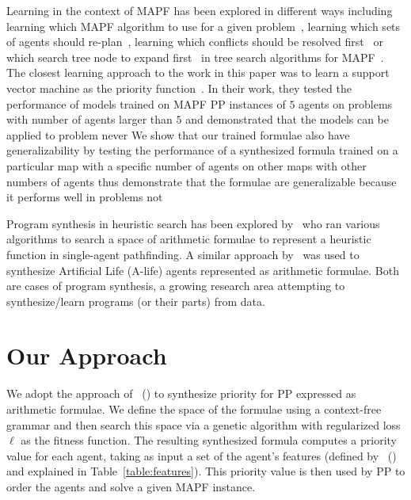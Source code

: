 \documentclass[letterpaper]{article} %
\newcommand{\citea}[1]{\citeauthor{#1}~(\citeyear{#1})}
\begin{document}
Learning in the context of MAPF has been explored in different ways including learning which MAPF algorithm to use for a given problem~\citep{sigurdson219automatic,ren221mapfast,alkazzi222mapfaster,kaduri22algorithm}, learning which sets of agents should re-plan~\citep{huang222anytime}, learning which conflicts should be resolved first~\citep{huang221learning2} or which search tree node to expand first~\citep{huang221learning} in tree search algorithms for MAPF~\citep{sharon2conflict,barer214suboptimal}. The closest learning approach to the work in this paper was to learn a support vector machine as the priority function~\cite{zhang222learning}. In their work, they tested the performance of models trained on MAPF PP instances of $ 5 $ agents on problems with number of agents larger than $ 5 $ and demonstrated that the models can be applied to problem never  We show that our trained formulae also have generalizability by testing the performance of a synthesized formula trained on a particular map with a specific number of agents on other maps with other numbers of agents thus demonstrate that the formulae are generalizable because it performs well in problems not 

Program synthesis in heuristic search has been explored by~\citet{cog22,bulitko221fast,sergio221,bulitko222portability} who ran various algorithms to search a space of arithmetic formulae to represent a heuristic function in single-agent pathfinding. A similar approach by~\citet{acs22} was used to synthesize Artificial Life (A-life) agents represented as arithmetic formulae. Both are cases of program synthesis, a growing research area attempting to synthesize/learn programs (or their parts) from data.

\section{Our Approach}
\label{ourApproach}

We adopt the approach of \citea{bulitko222portability} to synthesize priority for PP expressed as arithmetic formulae. We define the space of the formulae using a context-free grammar and then search this space via a genetic algorithm with regularized loss $\ell$ as the fitness function.
The resulting synthesized formula computes a priority value for each agent, taking as input a set of the agent's features (defined by \citea{zhang222learning} and explained in Table~\ref{table:features}).
This priority value is then used by PP to order the agents and solve a given MAPF instance.
\end{document}
